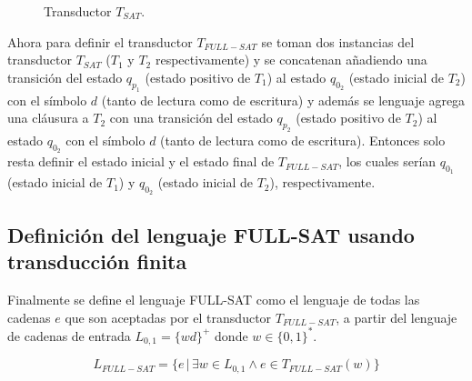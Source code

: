 \documentclass{article}
\begin{document}
\begin{figure}[h]
    \centering {}
    \caption{Transductor $T_{SAT}$.}
    \label{fig:transducer} %
\end{figure}

Ahora para definir el transductor $T_{FULL-SAT}$ se toman dos instancias del transductor $T_{SAT}$ ($T_1$ y $T_2$ respectivamente) y se concatenan
añadiendo una transición del estado $q_{p_1}$ (estado positivo de $T_1$) al estado $q_{0_2}$ (estado inicial de $T_2$) con el símbolo $d$ (tanto de
lectura como de escritura) y además se lenguaje agrega una cláusura a $T_2$ con una transición del estado $q_{p_2}$
(estado positivo de $T_2$) al estado $q_{0_2}$ con el símbolo $d$ (tanto de lectura como de escritura). Entonces solo resta definir
el estado inicial y el estado final de $T_{FULL-SAT}$, los cuales serían $q_{0_1}$ (estado inicial de $T_1$) y $q_{0_2}$ (estado inicial de $T_2$),
respectivamente.

\subsection{Definición del lenguaje FULL-SAT usando transducción finita}

Finalmente se define el lenguaje FULL-SAT como el lenguaje de todas las cadenas $e$ que son aceptadas por el transductor $T_{FULL-SAT}$, a partir del lenguaje
de cadenas de entrada $L_{0,1}=\{wd\}^+$ donde $w\in \{0,1\}^*$. 

$$L_{FULL-SAT} = \{e\,|\,\exists w \in L_{0,1} \wedge e \in T_{FULL-SAT}(w) \}$$
\end{document}
